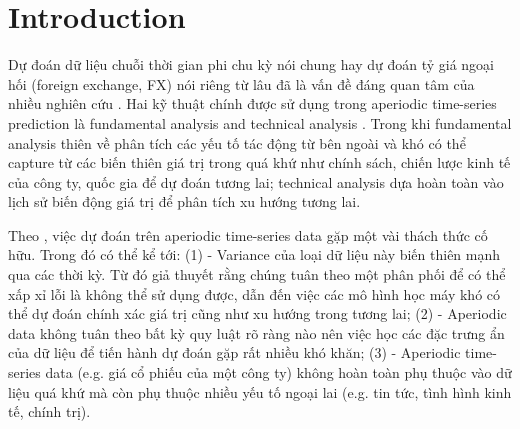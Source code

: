 \documentclass[aps,prb,groupedaddress,twocolumn,showpacs,dvipdfmx,superscriptaddress,pdftex]{revtex4-2}
\begin{document}
\maketitle

\section{Introduction}
\label{sec.intro}

Dự đoán dữ liệu chuỗi thời gian phi chu kỳ nói chung hay dự đoán tỷ giá ngoại hối (foreign exchange, FX) nói riêng từ lâu đã là vấn đề đáng quan tâm của nhiều nghiên cứu \citep{li2019multi, islam2021foreign, heryadi2021foreign}. Hai kỹ thuật chính được sử dụng trong aperiodic time-series prediction là fundamental analysis and technical analysis \cite{ayitey2023forex}. Trong khi fundamental analysis thiên về phân tích các yếu tố tác động từ bên ngoài và khó có thể capture từ các biến thiên giá trị trong quá khứ như chính sách, chiến lược kinh tế của công ty, quốc gia để dự đoán tương lai; technical analysis dựa hoàn toàn vào lịch sử biến động giá trị để phân tích xu hướng tương lai.


\vspace{2mm}

Theo \cite{li2019multi}, việc dự đoán trên aperiodic time-series data gặp một vài thách thức cố hữu. Trong đó có thể kể tới: (1) - Variance của loại dữ liệu này biến thiên mạnh qua các thời kỳ. Từ đó giả thuyết rằng chúng tuân theo một phân phối để có thể xấp xỉ lỗi là không thể sử dụng được, dẫn đến việc các mô hình học máy khó có thể dự đoán chính xác giá trị cũng như xu hướng trong tương lai; (2) - Aperiodic data không tuân theo bất kỳ quy luật rõ ràng nào nên việc học các đặc trưng ẩn của dữ liệu để tiến hành dự đoán gặp rất nhiều khó khăn; (3) - Aperiodic time-series data (e.g. giá cổ phiếu của một công ty) không hoàn toàn phụ thuộc vào dữ liệu quá khứ mà còn phụ thuộc nhiều yếu tố ngoại lai (e.g. tin tức, tình hình kinh tế, chính trị).
\end{document}

